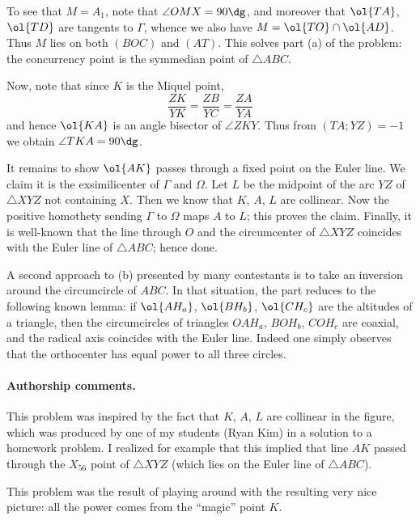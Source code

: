 To see that $M = A_1$, note that $\angle OMX = 90\dg$,
and moreover that $\ol{TA}$, $\ol{TD}$ are tangents to $\Gamma$,
whence we also have $M = \ol{TO} \cap \ol{AD}$.
Thus $M$ lies on both $(BOC)$ and $(AT)$.
This solves part (a) of the problem:
the concurrency point is the symmedian point of $\triangle ABC$.

Now, note that since $K$ is the Miquel point,
\[ \frac{ZK}{YK} = \frac{ZB}{YC} = \frac{ZA}{YA} \]
and hence $\ol{KA}$ is an angle bisector of $\angle ZKY$.
Thus from $(TA;YZ)=-1$ we obtain $\angle TKA = 90\dg$.

It remains to show $\ol{AK}$ passes through a fixed point on the Euler line.
We claim it is the exsimilicenter of $\Gamma$ and $\Omega$.
Let $L$ be the midpoint of the arc $YZ$ of $\triangle XYZ$ not containing $X$.
Then we know that $K$, $A$, $L$ are collinear.
Now the positive homothety sending $\Gamma$ to $\Omega$ maps $A$ to $L$;
this proves the claim.
Finally, it is well-known that the line through $O$
and the circumcenter of $\triangle XYZ$
coincides with the Euler line of $\triangle ABC$;
hence done.

A second approach to (b) presented by many contestants
is to take an inversion around the circumcircle of $ABC$.
In that situation, the part reduces to the following
known lemma: if $\ol{AH_a}$, $\ol{BH_b}$, $\ol{CH_c}$
are the altitudes of a triangle,
then the circumcircles of triangles $OAH_a$, $BOH_b$, $COH_c$
are coaxial, and the radical axis coincides with the Euler line.
Indeed one simply observes that the orthocenter
has equal power to all three circles.

\paragraph{Authorship comments.}
This problem was inspired by the fact that $K$, $A$, $L$
are collinear in the figure,
which was produced by one of my students (Ryan Kim)
in a solution to a homework problem.
I realized for example that this implied that line $AK$
passed through the $X_{56}$ point of $\triangle XYZ$
(which lies on the Euler line of $\triangle ABC$).

This problem was the result of playing around with
the resulting very nice picture:
all the power comes from the ``magic'' point $K$.
